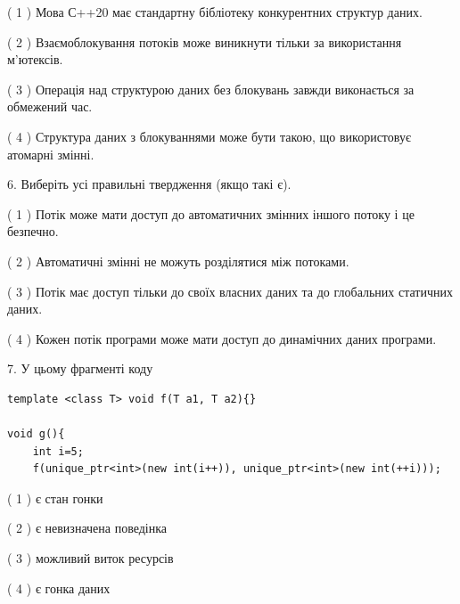 \documentclass[12pt, ukrainian]{article}
\begin{document}
\begin {large}
{( 1 ) Мова С++20 має стандартну бібліотеку конкурентних структур даних.%

( 2 ) Взаємоблокування потоків може виникнути тільки за використання м’ютексів.%

( 3 ) Операція над структурою даних без блокувань завжди виконається за обмежений час.%

( 4 ) Структура даних з блокуваннями може бути такою, що використовує атомарні змінні.%
\newpage



\vspace{5mm}
6. Виберіть усі правильні твердження (якщо такі є).\par
\vspace{2mm}

( 1 ) Потік може мати доступ до автоматичних змінних іншого потоку і це безпечно.%

( 2 ) Автоматичні змінні не можуть розділятися між потоками.%

( 3 ) Потік має доступ тільки до своїх власних даних та до глобальних статичних даних.%

( 4 ) Кожен потік програми може мати доступ до динамічних даних програми.%


\vspace{5mm}
7. У цьому фрагменті коду
\begin{verbatim}
template <class T> void f(T a1, T a2){}

void g(){
    int i=5;
    f(unique_ptr<int>(new int(i++)), unique_ptr<int>(new int(++i)));
\end{verbatim}

( 1 ) є стан гонки%

( 2 ) є невизначена поведінка%

( 3 ) можливий виток ресурсів%

( 4 ) є гонка даних%
}
\end {large}
\end{document}
